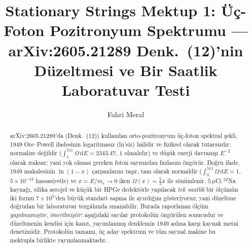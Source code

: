 \documentclass[twocolumn]{svjour3}
\begin{document}
\title{Stationary Strings Mektup 1: Üç-Foton Pozitronyum Spektrumu ---
arXiv:2605.21289 Denk.~(12)'nin Düzeltmesi ve Bir Saatlik Laboratuvar Testi}

\author{Fahri Meral}


\begin{abstract}
arXiv:2605.21289'da (Denk.~(12)) kullanılan orto-pozitronyum üç-foton
spektral şekli, 1949 Ore--Powell ifadesinin logaritmasız (ln'siz) hâlidir
ve fiziksel olarak tutarsızdır: normalize değildir
($\int_1^{511}\allowbreak\Omega\,\mathrm{d}E = 2343.47$, $1$ olmalıdır) ve
düşük enerji davranışı $E^{-2}$ olarak ıraksar; yani yok olması gereken
foton sayısından fazlasını öngörür. Doğru ifade, 1949 makalesinin
$\ln(1-x)$ çarpanlarını taşır, tam olarak normaldir
($\int_0^{511}\allowbreak\Omega\,\mathrm{d}E = 1$, $5\times10^{-13}$
hassasiyetle) ve $x = E/m_e \to 0$ iken $\Omega(x)\sim\tfrac{5}{3}x$ ile
sönümlenir. $5\,\mu$Ci $^{22}$Na kaynağı, silika aerojel ve küçük bir HPGe
dedektörle yapılacak \emph{tek saatlik} bir ölçümün iki formu
$7\times10^{5}$'den büyük standart sapma ile ayırdığını gösteriyoruz;
yani düzeltme doğrudan bir laboratuvar tezgâhında sınanabilir. Burada
raporlanan ölçüm \emph{yapılmamıştır, önerilmiştir}: aşağıdaki sayılar
protokolün öngörülen sonucudur ve düzeltmenin kendisi için kanıt,
yayımlanmış denklemin 1949 aslına karşı kaynak metni denetimidir.
Protokolün tamamı, üç aday spektrum ve tüm sayısal makine bu mektupla
birlikte yayımlanmaktadır.
\end{abstract}


\maketitle
\end{document}

